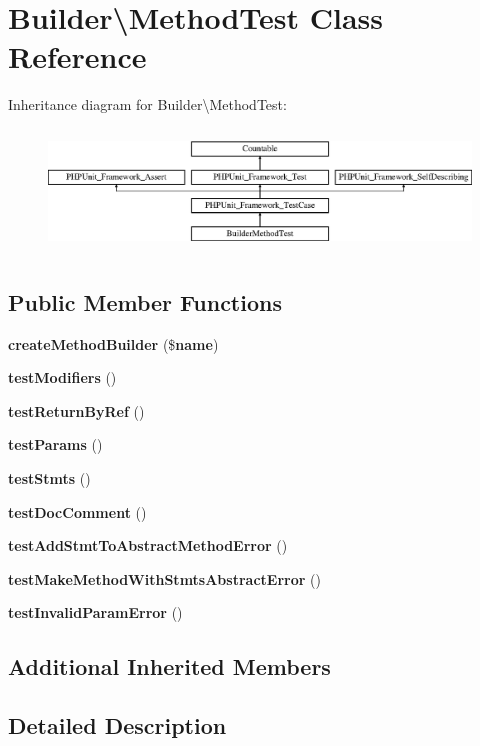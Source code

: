 \section{Builder\textbackslash{}Method\+Test Class Reference}
\label{class_php_parser_1_1_builder_1_1_method_test}
Inheritance diagram for Builder\textbackslash{}Method\+Test\+:\begin{figure}[H]
\begin{center}
\leavevmode
\includegraphics[height=3.303835cm]{class_php_parser_1_1_builder_1_1_method_test}
\end{center}
\end{figure}
\subsection*{Public Member Functions}
\begin{DoxyCompactItemize}
\item 
{\bf create\+Method\+Builder} (\${\bf name})
\item 
{\bf test\+Modifiers} ()
\item 
{\bf test\+Return\+By\+Ref} ()
\item 
{\bf test\+Params} ()
\item 
{\bf test\+Stmts} ()
\item 
{\bf test\+Doc\+Comment} ()
\item 
{\bf test\+Add\+Stmt\+To\+Abstract\+Method\+Error} ()
\item 
{\bf test\+Make\+Method\+With\+Stmts\+Abstract\+Error} ()
\item 
{\bf test\+Invalid\+Param\+Error} ()
\end{DoxyCompactItemize}
\subsection*{Additional Inherited Members}


\subsection{Detailed Description}


